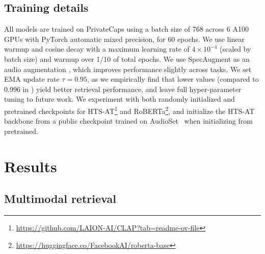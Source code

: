 \documentclass{article}
\begin{document}
\subsection{Training details}

All models are trained on PrivateCaps using a batch size of 768 across 6 A100 GPUs with PyTorch automatic mixed precision, for 60 epochs.
We use linear warmup and cosine decay with a maximum learning rate of $4 \times 10^{-4}$ (scaled by batch size) and warmup over 1/10 of total epochs. We use SpecAugment as an audio augmentation \cite{park2019specaugment}, which improves performance slightly across tasks. We set EMA update rate $\tau = 0.95$, as we empirically find that lower values (compared to 0.996 in \cite{niizumi2021byol}) yield better retrieval performance, and leave full hyper-parameter tuning to future work. We experiment with both randomly initialized and pretrained checkpoints for HTS-AT\footnote{\hyperlink{https://github.com/LAION-AI/CLAP?tab=readme-ov-file}{https://github.com/LAION-AI/CLAP?tab=readme-ov-file}} and RoBERTa\footnote{\hyperlink{https://huggingface.co/FacebookAI/roberta-base}{https://huggingface.co/FacebookAI/roberta-base}}, and initialize the HTS-AT backbone from a public checkpoint trained on AudioSet~\cite{audioset} when initializing from pretrained.


\section{Results}

\subsection{Multimodal retrieval}
\end{document}
